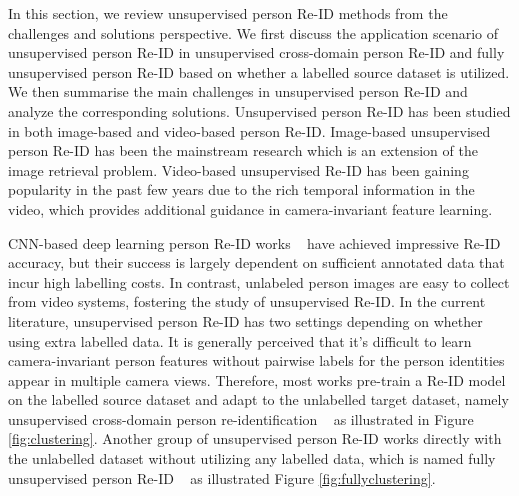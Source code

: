 \documentclass[a4paper,fleqn]{cas-dc}
\begin{document}
In this section, we review unsupervised person Re-ID methods from the challenges and solutions perspective. We first discuss the application scenario of unsupervised person Re-ID in unsupervised cross-domain person Re-ID and fully unsupervised person Re-ID based on whether a labelled source dataset is utilized. We then summarise the main challenges in unsupervised person Re-ID and analyze the corresponding solutions. Unsupervised person Re-ID has been studied in both image-based and video-based person Re-ID. Image-based unsupervised person Re-ID has been the mainstream research which is an extension of the image retrieval problem. Video-based unsupervised Re-ID has been gaining popularity in the past few years due to the rich temporal information in the video, which provides additional guidance in camera-invariant feature learning.

CNN-based deep learning person Re-ID works ~\cite{sun_beyond_2018,wang_learning_2018} have achieved impressive Re-ID accuracy, but their success is largely dependent on sufficient annotated data that incur high labelling costs. In contrast, unlabeled person images are easy to collect from video systems, fostering the study of unsupervised Re-ID. In the current literature, unsupervised person Re-ID has two settings depending on whether using extra labelled data. It is generally perceived that it's difficult to learn camera-invariant person features without pairwise labels for the person identities appear in multiple camera views. Therefore, most works pre-train a Re-ID model on the labelled source dataset and adapt to the unlabelled target dataset, namely unsupervised cross-domain person re-identification ~\cite{wei_person_2018,zhong_invariance_2019,ge_mutual_2020} as illustrated in Figure \ref{fig:clustering}. Another group of unsupervised person Re-ID works directly with the unlabelled dataset without utilizing any labelled data, which is named fully unsupervised person Re-ID ~\cite{lin_bottom-up_2019,lin_unsupervised_2020,zeng_hierarchical_2020} as illustrated Figure \ref{fig:fullyclustering}.
\end{document}
